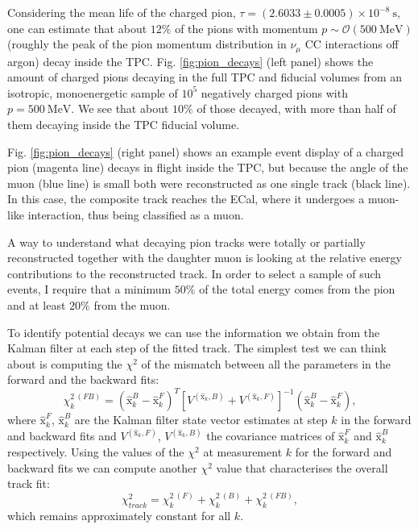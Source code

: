 Considering the mean life of the charged pion, $\tau = (2.6033\pm0.0005)\times10^{-8} \ \mathrm{s}$, one can estimate that about $12\%$ of the pions with momentum $p \sim \mathcal{O}(500 \ \mathrm{MeV})$ (roughly the peak of the pion momentum distribution in $\nu_{\mu}$ CC interactions off argon) decay inside the TPC. Fig. \ref{fig:pion_decays} (left panel) shows the amount of charged pions decaying in the full TPC and fiducial volumes from an isotropic, monoenergetic sample of $10^{5}$ negatively charged pions with $p=500 \ \mathrm{MeV}$. We see that about $10\%$ of those decayed, with more than half of them decaying inside the TPC fiducial volume.

Fig. \ref{fig:pion_decays} (right panel) shows an example event display of a charged pion (magenta line) decays in flight inside the TPC, but because the angle of the muon (blue line) is small both were reconstructed as one single track (black line). In this case, the composite track reaches the ECal, where it undergoes a muon-like interaction, thus being classified as a muon.

A way to understand what decaying pion tracks were totally or partially reconstructed together with the daughter muon is looking at the relative energy contributions to the reconstructed track. In order to select a sample of such events, I require that a minimum $50\%$ of the total energy comes from the pion and at least $20\%$ from the muon.

To identify potential decays we can use the information we obtain from the Kalman filter at each step of the fitted track. The simplest test we can think about is computing the $\chi^{2}$ of the mismatch between all the parameters in the forward and the backward fits:
\begin{equation}
	\chi^{2 \ (FB)}_{k} = (\hat{\mathrm{x}}^{B}_{k}-\hat{\mathrm{x}}^{F}_{k})^{T}[V^{(\hat{\mathrm{x}}_{k},B)}+V^{(\hat{\mathrm{x}}_{k},F)}]^{-1}(\hat{\mathrm{x}}^{B}_{k}-\hat{\mathrm{x}}^{F}_{k}),
\end{equation}
where $\hat{\mathrm{x}}^{F}_{k}$, $\hat{\mathrm{x}}^{B}_{k}$ are the Kalman filter state vector estimates at step $k$ in the forward and backward fits and $V^{(\hat{\mathrm{x}}_{k},F)}$, $V^{(\hat{\mathrm{x}}_{k},B)}$ the covariance matrices of $\hat{\mathrm{x}}^{F}_{k}$ and $\hat{\mathrm{x}}^{B}_{k}$ respectively. Using the values of the $\chi^{2}$ at measurement $k$ for the forward and backward fits we can compute another $\chi^{2}$ value that characterises the overall track fit:
\begin{equation}
	\chi^{2}_{track} = \chi^{2 \ (F)}_{k} + \chi^{2 \ (B)}_{k} + \chi^{2 \ (FB)}_{k},
\end{equation}
which remains approximately constant for all $k$.

